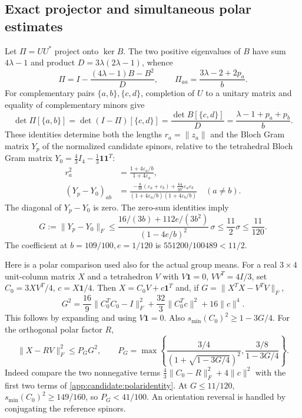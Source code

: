 \subsection{Exact projector and simultaneous polar estimates}
Let $\Pi=UU^*$ project onto $\ker B$. The two positive eigenvalues of $B$
have sum $4\lambda-1$ and product $D=3\lambda(2\lambda-1)$, whence
\[
 \Pi=I-\frac{(4\lambda-1)B-B^2}{D},\qquad
 \Pi_{aa}=\frac{3\lambda-2+2p_a}{b}.
\]
For complementary pairs $\{a,b\},\{c,d\}$, completion of $U$ to a
unitary matrix and equality of complementary minors give
\[
 \det\Pi[\{a,b\}]=\det(I-\Pi)[\{c,d\}]
 =\frac{\det B[\{c,d\}]}{D}=\frac{\lambda-1+p_a+p_b}{b}.
\]
These identities determine both the lengths $r_a=\|z_a\|$ and the
Bloch Gram matrix $Y_p$ of the normalized candidate spinors, relative
to the tetrahedral Bloch Gram matrix
$Y_0=\frac43I_4-\frac13\mathbf1\mathbf1^T$:
\begin{align}
 r_a^2&=\frac{1+4\varepsilon_a/b}{1+4\varepsilon_a},\label{app:candidate:projector}\\
 (Y_p-Y_0)_{ab}
 &=\frac{-\frac8{3b}(\varepsilon_a+\varepsilon_b)
                +\frac{64}{3b^2}\varepsilon_a\varepsilon_b}
 {(1+4\varepsilon_a/b)(1+4\varepsilon_b/b)}\quad(a\ne b).\label{app:candidate:Ygram}
\end{align}
The diagonal of $Y_p-Y_0$ is zero. The zero-sum identities imply
\[
 G:=\|Y_p-Y_0\|_F\le
 \frac{16/(3b)+112e/(3b^2)}{(1-4e/b)^2}\,\sigma
 \le\frac{11}{2}\sigma\le\frac{11}{120}.
\]
The coefficient at $b=109/100,e=1/120$ is $551200/100489<11/2$.

Here is a polar comparison used also for the actual group means.
For a real $3\times4$ unit-column matrix $X$ and a tetrahedron $V$ with
$V\mathbf1=0$, $VV^T=4I/3$, set $C_0=3XV^T/4$, $c=X\mathbf1/4$.
Then $X=C_0V+c\mathbf1^T$ and, if $G=\|X^TX-V^TV\|_F$,
\begin{equation}\label{app:candidate:polaridentity}
 G^2=\frac{16}{9}\|C_0^TC_0-I\|_F^2
       +\frac{32}{3}\|C_0^Tc\|^2+16\|c\|^4.
\end{equation}
This follows by expanding and using $V\mathbf1=0$. Also
$s_{\min}(C_0)^2\ge1-3G/4$. For the orthogonal polar factor $R$,
\begin{equation}\label{app:candidate:polar}
 \|X-RV\|_F^2\le P_G G^2,\qquad
 P_G=\max\left\{\frac{3/4}{(1+\sqrt{1-3G/4})^2},
                      \frac{3/8}{1-3G/4}\right\}.
\end{equation}
Indeed compare the two nonnegative terms
$\frac43\|C_0-R\|_F^2+4\|c\|^2$ with the first two terms of
\eqref{app:candidate:polaridentity}. At $G\le11/120$,
$s_{\min}(C_0)^2\ge149/160$, so $P_G<41/100$.
An orientation reversal is handled by conjugating the reference spinors.

